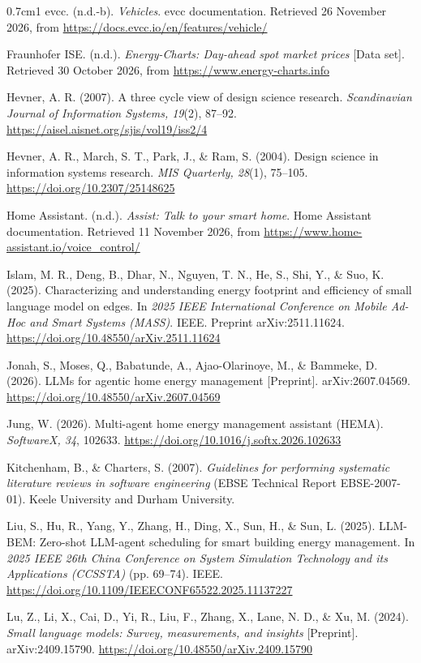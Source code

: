 \begin{hangparas}{0.7cm}{1}
evcc. (n.d.-b). \textit{Vehicles}. evcc documentation. Retrieved 26
November 2026, from \url{https://docs.evcc.io/en/features/vehicle/}

Fraunhofer ISE. (n.d.). \textit{Energy-Charts: Day-ahead spot market
prices} [Data set]. Retrieved 30 October 2026, from
\url{https://www.energy-charts.info}

Hevner, A. R. (2007). A three cycle view of design science research.
\textit{Scandinavian Journal of Information Systems, 19}(2), 87--92.
\url{https://aisel.aisnet.org/sjis/vol19/iss2/4}

Hevner, A. R., March, S. T., Park, J., \& Ram, S. (2004). Design
science in information systems research. \textit{MIS Quarterly, 28}(1),
75--105. \url{https://doi.org/10.2307/25148625}

Home Assistant. (n.d.). \textit{Assist: Talk to your smart home}.
Home Assistant documentation. Retrieved 11 November 2026, from
\url{https://www.home-assistant.io/voice_control/}

Islam, M. R., Deng, B., Dhar, N., Nguyen, T. N., He, S., Shi, Y., \&
Suo, K. (2025). Characterizing and understanding energy footprint and
efficiency of small language model on edges. In \textit{2025 IEEE
International Conference on Mobile Ad-Hoc and Smart Systems (MASS)}.
IEEE. Preprint arXiv:2511.11624.
\url{https://doi.org/10.48550/arXiv.2511.11624}

Jonah, S., Moses, Q., Babatunde, A., Ajao-Olarinoye, M., \& Bammeke, D.
(2026). LLMs for agentic home energy management [Preprint].
arXiv:2607.04569. \url{https://doi.org/10.48550/arXiv.2607.04569}

Jung, W. (2026). Multi-agent home energy management assistant (HEMA).
\textit{SoftwareX, 34}, 102633.
\url{https://doi.org/10.1016/j.softx.2026.102633}

Kitchenham, B., \& Charters, S. (2007). \textit{Guidelines for
performing systematic literature reviews in software engineering}
(EBSE Technical Report EBSE-2007-01). Keele University and Durham
University.

Liu, S., Hu, R., Yang, Y., Zhang, H., Ding, X., Sun, H., \& Sun, L.
(2025). LLM-BEM: Zero-shot LLM-agent scheduling for smart building
energy management. In \textit{2025 IEEE 26th China Conference on System
Simulation Technology and its Applications (CCSSTA)} (pp. 69--74). IEEE.
\url{https://doi.org/10.1109/IEEECONF65522.2025.11137227}

Lu, Z., Li, X., Cai, D., Yi, R., Liu, F., Zhang, X., Lane, N. D., \&
Xu, M. (2024). \textit{Small language models: Survey, measurements, and
insights} [Preprint]. arXiv:2409.15790.
\url{https://doi.org/10.48550/arXiv.2409.15790}


\end{hangparas}
